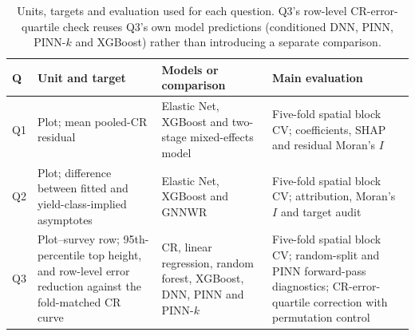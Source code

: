 \documentclass[logo,msc,ai]{infthesis}           %
\begin{document}
\begin{table}[!ht]
\centering
\footnotesize
\renewcommand{\arraystretch}{1.15}

\begin{tabularx}{\linewidth}{@{} l >{\raggedright\arraybackslash}X >{\raggedright\arraybackslash}X >{\raggedright\arraybackslash}X @{}}
\toprule
Q & Unit and target & Models or comparison & Main evaluation \\
\midrule
Q1 & Plot; mean pooled-CR residual & Elastic Net, XGBoost and two-stage
mixed-effects model & Five-fold spatial block CV; coefficients, SHAP and residual Moran's $I$ \\
Q2 & Plot; difference between fitted and yield-class-implied asymptotes & Elastic Net, XGBoost
and GNNWR & Five-fold spatial block CV; attribution, Moran's $I$ and target audit \\
Q3 & Plot--survey row; 95th-percentile top height, and row-level error reduction against the
fold-matched CR curve & CR, linear regression, random forest, XGBoost, DNN, PINN and PINN-$k$
& Five-fold spatial block CV; random-split and PINN forward-pass diagnostics; CR-error-quartile
correction with permutation control \\
\bottomrule
\end{tabularx}
\caption{\small{Units, targets and evaluation used for each question. Q3's row-level CR-error-quartile
check reuses Q3's own model predictions (conditioned DNN, PINN, PINN-$k$ and XGBoost) rather
than introducing a separate comparison.}}
\label{tab:rq-framework}
\end{table}
\end{document}
